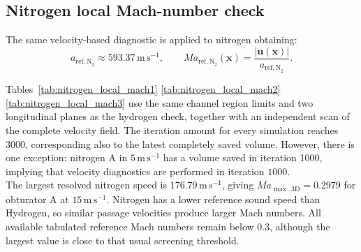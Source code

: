 \subsection{Nitrogen local Mach-number check}
\label{sec:nitrogen_mach}

The same velocity-based diagnostic is applied to nitrogen obtaining:
\begin{equation}
a_{\mathrm{ref,N}_2}\approx 593.37\,\mathrm{m\,s^{-1}},
\qquad Ma_{\mathrm{ref,N}_2}(\mathbf{x})=\frac{|\mathbf{u}(\mathbf{x})|}{a_{\mathrm{ref,N}_2}}.
\label{eq:nitrogen_sound_speed}
\end{equation}

Tables~\ref{tab:nitrogen_local_mach1} \ref{tab:nitrogen_local_mach2} \ref{tab:nitrogen_local_mach3} use the same channel region limits and two longitudinal planes as the hydrogen check, together with an independent scan of the complete velocity field. The iteration amount for every simulation reaches $3000$, corresponding also to the latest completely saved volume. However, there is one exception: nitrogen A in $5\,\mathrm{m\,s^{-1}}$ has a volume saved in iteration 1000, implying that velocity diagnostics are performed in iteration $1000$.\\

The largest resolved nitrogen speed is $176.79\,\mathrm{m\,s^{-1}}$, giving $Ma_{\max,\mathrm{3D}}=0.2979$ for obturator A at $15\,\mathrm{m\,s^{-1}}$. Nitrogen has a lower reference sound speed than Hydrogen, so similar passage velocities produce larger Mach numbers. All available tabulated reference Mach numbers remain below $0.3$, although the largest value is close to that usual screening threshold.

